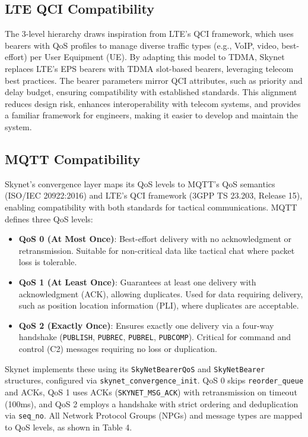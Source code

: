 \documentclass{article}
\begin{document}
\subsection{LTE QCI Compatibility}
The 3-level hierarchy draws inspiration from LTE's QCI framework, which uses bearers with QoS
profiles to manage diverse traffic types (e.g., VoIP, video, best-effort) per User Equipment (UE).
By adapting this model to TDMA, Skynet replaces LTE's EPS bearers with TDMA slot-based bearers,
leveraging telecom best practices. The bearer parameters mirror QCI attributes,
such as priority and delay budget, ensuring compatibility with established standards. This alignment
reduces design risk, enhances interoperability with telecom systems, and provides a familiar
framework for engineers, making it easier to develop and maintain the system.

\subsection{MQTT Compatibility}
Skynet’s convergence layer maps its QoS levels to MQTT’s QoS semantics (ISO/IEC 20922:2016) and LTE’s
QCI framework (3GPP TS 23.203, Release 15), enabling compatibility with both standards for tactical
communications. MQTT defines three QoS levels:
\begin{itemize}
    \item \textbf{QoS 0 (At Most Once)}: Best-effort delivery with no acknowledgment or retransmission.
          Suitable for non-critical data like tactical chat where packet loss is tolerable.
    \item \textbf{QoS 1 (At Least Once)}: Guarantees at least one delivery with acknowledgment (ACK),
          allowing duplicates. Used for data requiring delivery, such as position location information
          (PLI), where duplicates are acceptable.
    \item \textbf{QoS 2 (Exactly Once)}: Ensures exactly one delivery via a four-way handshake
          (\texttt{PUBLISH}, \texttt{PUBREC}, \texttt{PUBREL}, \texttt{PUBCOMP}). Critical for
          command and control (C2) messages requiring no loss or duplication.
\end{itemize}
Skynet implements these using its \texttt{SkyNetBearerQoS} and \texttt{SkyNetBearer} structures,
configured via \texttt{skynet\_convergence\_init}. QoS 0 skips \texttt{reorder\_queue} and ACKs, QoS 1
uses ACKs (\texttt{SKYNET\_MSG\_ACK}) with retransmission on timeout (100ms), and QoS 2 employs a
handshake with strict ordering and deduplication via \texttt{seq\_no}. All Network Protocol Groups
(NPGs) and message types are mapped to QoS levels, as shown in Table 4.
\end{document}
